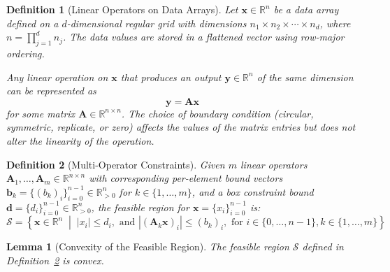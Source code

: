 \documentclass{article}
\newtheorem{lemma}{Lemma}
\newtheorem{definition}{Definition}
\begin{document}
\begin{definition}[Linear Operators on Data Arrays]
\label{lem:linear-operator}
Let $\mathbf{x} \in \mathbb{R}^n$ be a data array defined on a $d$-dimensional regular grid with dimensions $n_1 \times n_2 \times \cdots \times n_d$, where $n = \prod_{j=1}^d n_j$. The data values are stored in a flattened vector using row-major ordering.

Any linear operation on $\mathbf{x}$ that produces an output $\mathbf{y} \in \mathbb{R}^n$ of the same dimension can be represented as
\begin{equation}
    \mathbf{y} = \mathbf{A}\mathbf{x}
\end{equation}
for some matrix $\mathbf{A} \in \mathbb{R}^{n \times n}$. The choice of boundary condition (circular, symmetric, replicate, or zero) affects the values of the matrix entries but does not alter the linearity of the operation.
\end{definition}

\begin{definition}[Multi-Operator Constraints]
\label{def:multi-operator-constraints}
Given $m$ linear operators $\mathbf{A}_1, \ldots, \mathbf{A}_m \in \mathbb{R}^{n \times n}$ with corresponding per-element bound vectors $\mathbf{b}_k = \{(b_k)_i\}_{i=0}^{n-1} \in \mathbb{R}^n_{>0}$ for $k \in \{1, \ldots, m\}$, and a box constraint bound $\mathbf{d} = \{d_i\}_{i=0}^{n-1} \in \mathbb{R}^n_{>0}$, the feasible region for $\mathbf{x} = \{x_i\}_{i=0}^{n-1}$ is:
\begin{equation}
    \mathcal{S} = \left\{ \mathbf{x} \in \mathbb{R}^n \;\middle|\; |x_i| \le d_i, \text{ and } |(\mathbf{A}_k \mathbf{x})_i| \le (b_k)_i, \text{ for } i \in \{0, \ldots, n-1\}, k \in \{1, \ldots, m\} \right\}
\end{equation}
\end{definition}

\begin{lemma}[Convexity of the Feasible Region]
\label{lem:feasible-region}
The feasible region $\mathcal{S}$ defined in Definition~\ref{def:multi-operator-constraints} is convex.
\end{lemma}
\end{document}
